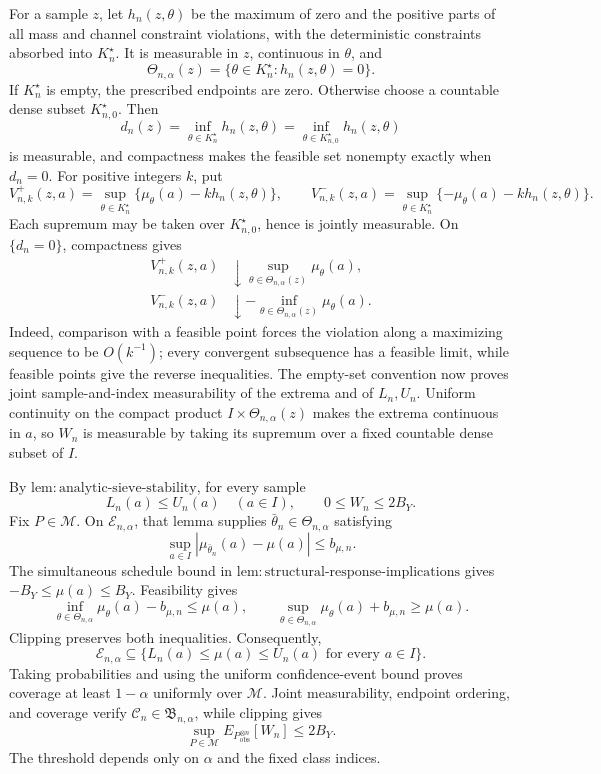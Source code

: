 For a sample \(z\), let \(h_n(z,\theta)\) be the maximum of zero and the positive parts of all mass and channel constraint violations, with the deterministic constraints absorbed into \(K_n^\star\).  It is measurable in \(z\), continuous in \(\theta\), and
\[
 \Theta_{n,\alpha}(z)=\{\theta\in K_n^\star:h_n(z,\theta)=0\}.
\]
If \(K_n^\star\) is empty, the prescribed endpoints are zero.  Otherwise choose a countable dense subset \(K_{n,0}^\star\).  Then
\[
 d_n(z)=\inf_{\theta\in K_n^\star}h_n(z,\theta)
       =\inf_{\theta\in K_{n,0}^\star}h_n(z,\theta)
\]
is measurable, and compactness makes the feasible set nonempty exactly when \(d_n=0\).  For positive integers \(k\), put
\[
 V_{n,k}^+(z,a)=\sup_{\theta\in K_n^\star}
 \{\mu_\theta(a)-kh_n(z,\theta)\},
 \qquad
 V_{n,k}^-(z,a)=\sup_{\theta\in K_n^\star}
 \{-\mu_\theta(a)-kh_n(z,\theta)\}.
\]
Each supremum may be taken over \(K_{n,0}^\star\), hence is jointly measurable.  On \(\{d_n=0\}\), compactness gives
\[
 \begin{aligned}
 V_{n,k}^+(z,a)&\downarrow
 \sup_{\theta\in\Theta_{n,\alpha}(z)}\mu_\theta(a),\\
 V_{n,k}^-(z,a)&\downarrow
 -\inf_{\theta\in\Theta_{n,\alpha}(z)}\mu_\theta(a).
 \end{aligned}
\]
Indeed, comparison with a feasible point forces the violation along a maximizing sequence to be \(O(k^{-1})\); every convergent subsequence has a feasible limit, while feasible points give the reverse inequalities.  The empty-set convention now proves joint sample-and-index measurability of the extrema and of \(L_n,U_n\).  Uniform continuity on the compact product \(I\times\Theta_{n,\alpha}(z)\) makes the extrema continuous in \(a\), so \(W_n\) is measurable by taking its supremum over a fixed countable dense subset of \(I\).

By \(\mathrm{lem{:}analytic\text{-}sieve\text{-}stability}\), for every sample
\[
 L_n(a)\le U_n(a)\quad(a\in I),
 \qquad 0\le W_n\le2B_Y.
\]
Fix \(P\in\mathcal M\).  On \(\mathcal E_{n,\alpha}\), that lemma supplies \(\bar\theta_n\in\Theta_{n,\alpha}\) satisfying
\[
 \sup_{a\in I}|\mu_{\bar\theta_n}(a)-\mu(a)|\le b_{\mu,n}.
\]
The simultaneous schedule bound in \(\mathrm{lem{:}structural\text{-}response\text{-}implications}\) gives \(-B_Y\le\mu(a)\le B_Y\).  Feasibility gives
\[
 \inf_{\theta\in\Theta_{n,\alpha}}\mu_\theta(a)-b_{\mu,n}\le\mu(a),
 \qquad
 \sup_{\theta\in\Theta_{n,\alpha}}\mu_\theta(a)+b_{\mu,n}\ge\mu(a).
\]
Clipping preserves both inequalities.  Consequently,
\[
 \mathcal E_{n,\alpha}\subseteq
 \{L_n(a)\le\mu(a)\le U_n(a)\text{ for every }a\in I\}.
\]
Taking probabilities and using the uniform confidence-event bound proves coverage at least \(1-\alpha\) uniformly over \(\mathcal M\).  Joint measurability, endpoint ordering, and coverage verify \(\mathcal C_n\in\mathfrak B_{n,\alpha}\), while clipping gives
\[
 \sup_{P\in\mathcal M}E_{P_{\mathrm{obs}}^{\otimes n}}[W_n]\le2B_Y.
\]
The threshold depends only on \(\alpha\) and the fixed class indices.

